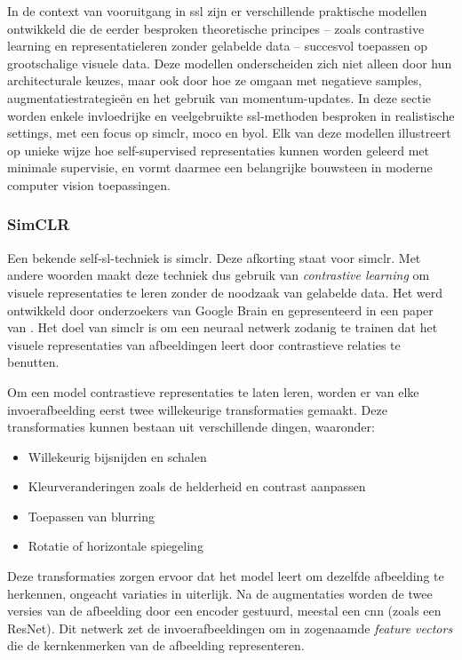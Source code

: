 In de context van vooruitgang in \gls{ssl} zijn er verschillende praktische modellen ontwikkeld die de eerder besproken theoretische principes -- zoals contrastive learning en representatieleren zonder gelabelde data -- succesvol toepassen op grootschalige visuele data. Deze modellen onderscheiden zich niet alleen door hun architecturale keuzes, maar ook door hoe ze omgaan met negatieve samples, augmentatiestrategieën en het gebruik van momentum-updates. In deze sectie worden enkele invloedrijke en veelgebruikte \gls{ssl}-methoden besproken in realistische settings, met een focus op \acrfull{simclr}, \acrfull{moco} en \acrfull{byol}. Elk van deze modellen illustreert op unieke wijze hoe self-supervised representaties kunnen worden geleerd met minimale supervisie, en vormt daarmee een belangrijke bouwsteen in moderne computer vision toepassingen.

\subsubsection{SimCLR}

Een bekende \gls{self-sl}-techniek is \acrshort{simclr}. Deze afkorting staat voor \acrlong{simclr}. Met andere woorden maakt deze techniek dus gebruik van \emph{contrastive learning} om visuele representaties te leren zonder de noodzaak van gelabelde data. Het werd ontwikkeld door onderzoekers van Google Brain en gepresenteerd in een paper van \textcite{Chen_2020}. Het doel van \gls{simclr} is om een neuraal netwerk zodanig te trainen dat het visuele representaties van afbeeldingen leert door contrastieve relaties te benutten.

Om een model contrastieve representaties te laten leren, worden er van elke invoerafbeelding eerst twee willekeurige transformaties gemaakt. Deze transformaties kunnen bestaan uit verschillende dingen, waaronder:

\begin{itemize}
    \item Willekeurig bijsnijden en schalen
    \item Kleurveranderingen zoals de helderheid en contrast aanpassen
    \item Toepassen van blurring
    \item Rotatie of horizontale spiegeling
\end{itemize}

Deze transformaties zorgen ervoor dat het model leert om dezelfde afbeelding te herkennen, ongeacht variaties in uiterlijk. Na de augmentaties worden de twee versies van de afbeelding door een encoder gestuurd, meestal een \gls{cnn} (zoals een ResNet). Dit netwerk zet de invoerafbeeldingen om in zogenaamde \emph{feature vectors} die de kernkenmerken van de afbeelding representeren. \\

